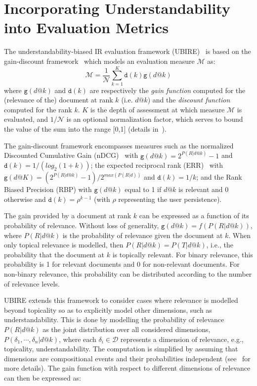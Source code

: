 \section{Incorporating Understandability into Evaluation Metrics}
\label{sec:understandability_metrics}
The understandability-biased IR evaluation framework (UBIRE)~\cite{zuccon14,zuccon16} is based on the gain-discount framework~\cite{carterette11} which models an evaluation measure $\mathcal{M}$ as:
%
\vspace{-4pt}
\begin{equation*}
\mathcal{M} = \frac{1}{\mathcal{N}} \sum_{k=1}^{K} \mathtt{d}(k) \mathtt{g}(d@k)
\end{equation*}
%
where $\mathtt{g}(d@k)$ and $\mathtt{d}(k)$ are respectively the \textit{gain function} computed for the (relevance of the) document at rank $k$ (i.e. $d@k$) and the \textit{discount function} computed for the rank $k$.
$K$ is the depth of assessment at which measure $\mathcal{M}$ is evaluated, and $1/\mathcal{N}$ is an optional normalization factor, which serves to bound the value of the sum into the range [0,1] (details in~\cite{carterette11}).

The gain-discount framework encompasses measures such as the normalized Discounted Cumulative Gain (nDCG)~\cite{jarvelin02} with $\mathtt{g}(d@k) = 2^{P(R|d@k)} - 1$ and $\mathtt{d}(k) = 1/(log_2(1 + k))$; the expected reciprocal rank (ERR)~\cite{chapelle09} with $\mathtt{g}(d@K) =  (2^{P (R|d@k)} - 1)/2^{max(P (R|d))}$ and $\mathtt{d}(k) = 1/k$; and the Rank Biased Precision (RBP) with $\mathtt{g}(d@k)$ equal to 1 if $d@k$ is relevant and 0 otherwise and $\mathtt{d}(k) = \rho^{k-1}$ (with $\rho$ representing the user persistence).

The gain provided by a document at rank $k$ can be expressed as a function of its probability of relevance. Without loss of generality, $\mathtt{g}(d@k) = f(P(R|d@k))$, where $P(R|d@k)$ is the probability of relevance given the document at $k$. 
When only topical relevance is modelled, then $P(R|d@k) = P(T|d@k)$, i.e., the probability that the document at $k$ is topically relevant. 
For binary relevance, this probability is 1 for relevant documents and 0 for non-relevant documents. For non-binary relevance, this probability can be distributed according to the number of relevance levels.

UBIRE extends this framework to consider cases where relevance is modelled beyond topicality so as to explicitly model other dimensions, such as understandability.
This is done by modelling the probability of relevance $P(R|d@k)$ as the joint distribution over all considered dimensions, $P(\delta_1, \cdots, \delta_n|d@k)$, where each $\delta_i \in \mathcal{D}$ represents a dimension of relevance, e.g., topicality, understandability. The computation is simplified by assuming that dimensions are compositional events and their probabilities independent (see~\cite{zuccon16} for more details). The gain function with respect to different dimensions of relevance can then be expressed as:

